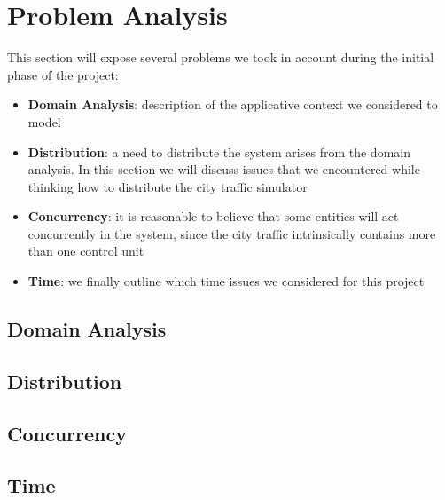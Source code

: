 \section{Problem Analysis}

This section will expose several problems we took in account during the
initial phase of the project:

\begin{itemize}
\item \textbf{Domain Analysis}: description of the applicative context we
  considered to model
\item \textbf{Distribution}: a need to distribute the system arises from the
  domain analysis. In this section we will discuss issues that we encountered
  while thinking how to distribute the city traffic simulator
\item \textbf{Concurrency}: it is reasonable to believe that some entities
  will act concurrently in the system, since the city traffic intrinsically
  contains more than one control unit
\item \textbf{Time}: we finally outline which time issues we considered for
  this project
\end{itemize}

\subsection{Domain Analysis}

\subsection{Distribution}

\subsection{Concurrency}

\subsection{Time}

